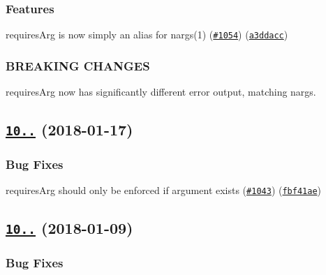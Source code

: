 \subsubsection*{Features}


\begin{DoxyItemize}
\item requires\+Arg is now simply an alias for nargs(1) (\href{https://github.com/yargs/yargs/issues/1054}{\tt \#1054}) (\href{https://github.com/yargs/yargs/commit/a3ddacc}{\tt a3ddacc})
\end{DoxyItemize}

\subsubsection*{B\+R\+E\+A\+K\+I\+NG C\+H\+A\+N\+G\+ES}


\begin{DoxyItemize}
\item requires\+Arg now has significantly different error output, matching nargs.
\end{DoxyItemize}

\label{_10.1.2}%
 \subsection*{\href{https://github.com/yargs/yargs/compare/v10.1.1...v10.1.2}{\tt 10..} (2018-\/01-\/17)}

\subsubsection*{Bug Fixes}


\begin{DoxyItemize}
\item requires\+Arg should only be enforced if argument exists (\href{https://github.com/yargs/yargs/issues/1043}{\tt \#1043}) (\href{https://github.com/yargs/yargs/commit/fbf41ae}{\tt fbf41ae})
\end{DoxyItemize}

\label{_10.1.1}%
 \subsection*{\href{https://github.com/yargs/yargs/compare/v10.1.0...v10.1.1}{\tt 10..} (2018-\/01-\/09)}

\subsubsection*{Bug Fixes}


